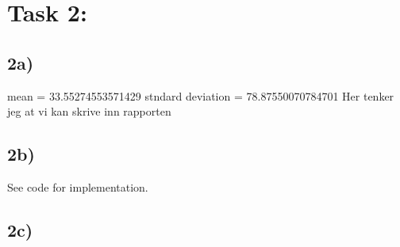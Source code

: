 \documentclass{article}
\begin{document}
\section*{Task 2:}

\subsection*{2a)}

mean = 33.55274553571429
stndard deviation  = 78.87550070784701
Her tenker jeg at vi kan skrive inn rapporten

\subsection*{2b)}

See code for implementation.

\subsection*{2c)}
\end{document}
